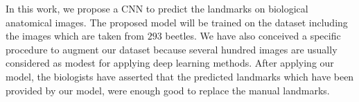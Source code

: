 \documentclass[review]{elsarticle}
\begin{document}
 


In this work, we propose a CNN to predict the landmarks on biological anatomical images. The proposed model will be trained on the dataset including the images which are taken from $293$ beetles. We have also conceived a specific procedure to augment our dataset because several hundred images are usually considered as modest for applying deep learning methods. After applying our model, the biologists have asserted that the predicted landmarks which have been provided by our model, were enough good to replace the manual landmarks.
\end{document}
